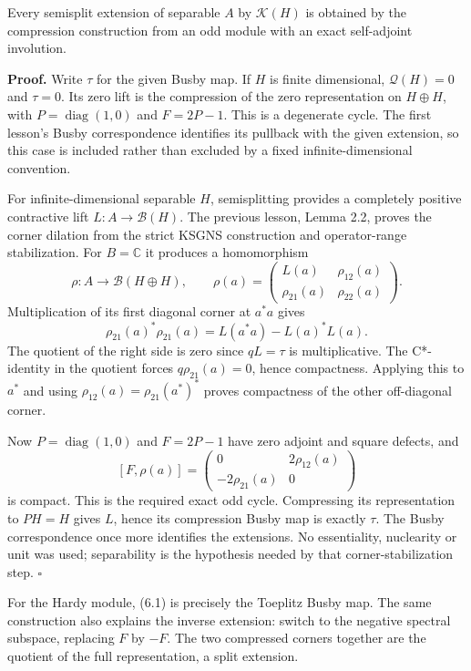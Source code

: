 \documentclass[
  11pt,
]{article}
\begin{document}
Every semisplit extension of separable \(A\) by \(\mathcal K(H)\) is
obtained by the compression construction from an odd module with an
exact self-adjoint involution.

\textbf{Proof.} Write \(\tau\) for the given Busby map. If \(H\) is
finite dimensional, \(\mathcal Q(H)=0\) and \(\tau=0\). Its zero lift is
the compression of the zero representation on \(H\oplus H\), with
\(P=\operatorname{diag}(1,0)\) and \(F=2P-1\). This is a degenerate
cycle. The first lesson's Busby correspondence identifies its pullback
with the given extension, so this case is included rather than excluded
by a fixed infinite-dimensional convention.

For infinite-dimensional separable \(H\), semisplitting provides a
completely positive contractive lift \(L:A\to\mathcal B(H)\). The
previous lesson, Lemma 2.2, proves the corner dilation from the strict
KSGNS construction and operator-range stabilization. For \(B=\mathbb C\)
it produces a homomorphism \[
\rho:A\longrightarrow\mathcal B(H\oplus H),\qquad
\rho(a)=\begin{pmatrix}L(a)&\rho_{12}(a)\\
                                  \rho_{21}(a)&\rho_{22}(a)\end{pmatrix}.
\] Multiplication of its first diagonal corner at \(a^*a\) gives \[
\rho_{21}(a)^*\rho_{21}(a)=L(a^*a)-L(a)^*L(a).
\] The quotient of the right side is zero since \(qL=\tau\) is
multiplicative. The C*-identity in the quotient forces
\(q\rho_{21}(a)=0\), hence compactness. Applying this to \(a^*\) and
using \(\rho_{12}(a)=\rho_{21}(a^*)^*\) proves compactness of the other
off-diagonal corner.

Now \(P=\operatorname{diag}(1,0)\) and \(F=2P-1\) have zero adjoint and
square defects, and \[
[F,\rho(a)]=\begin{pmatrix}0&2\rho_{12}(a)\\ -2\rho_{21}(a)&0\end{pmatrix}
\] is compact. This is the required exact odd cycle. Compressing its
representation to \(PH=H\) gives \(L\), hence its compression Busby map
is exactly \(\tau\). The Busby correspondence once more identifies the
extensions. No essentiality, nuclearity or unit was used; separability
is the hypothesis needed by that corner-stabilization step. \(\square\)

For the Hardy module, (6.1) is precisely the Toeplitz Busby map. The
same construction also explains the inverse extension: switch to the
negative spectral subspace, replacing \(F\) by \(-F\). The two
compressed corners together are the quotient of the full representation,
a split extension.
\end{document}
